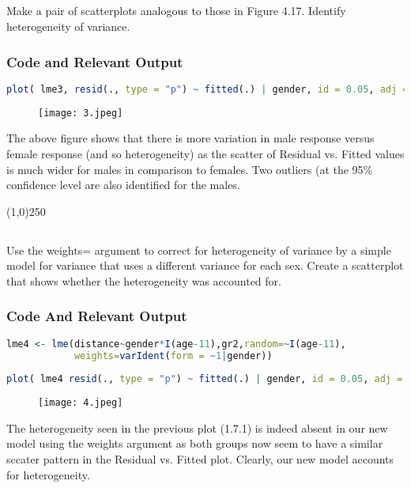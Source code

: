 \documentclass[a4paper]{article}
\begin{document}
\subsection{}Make a pair of scatterplots analogous to those in Figure 4.17. Identify heterogeneity of variance.
\subsubsection{Code and Relevant Output}
\begin{lstlisting}[language=R]
plot( lme3, resid(., type = "p") ~ fitted(.) | gender, id = 0.05, adj = -0.3 )
\end{lstlisting}
\begin{figure}[H]
\centering
\texttt{[image: 3.jpeg]}\\
\end{figure}
 The above figure shows that there is more variation in male response versus female response (and so heterogeneity) as the scatter of Residual vs. Fitted values is much wider for males in comparison to females. Two outliers (at the 95\% confidence level are also identified for the males.
\begin{center}
\line(1,0){250}
\end{center}


\subsection{}Use the weights= argument to correct for heterogeneity of variance by a simple model for variance that uses a different variance for each sex. Create a scatterplot that shows whether the heterogeneity was accounted for.
\subsubsection{Code And Relevant Output}
\begin{lstlisting}[language=R]
lme4 <- lme(distance~gender*I(age-11),gr2,random=~I(age-11), 
			weights=varIdent(form = ~1|gender))
            
plot( lme4 resid(., type = "p") ~ fitted(.) | gender, id = 0.05, adj = -0.3 )
\end{lstlisting}
\begin{figure}[H]
\centering
\texttt{[image: 4.jpeg]}\\
\end{figure}
 The heterogeneity seen in the previous plot (1.7.1) is indeed absent in our new model using the weights argument as both groups now seem to have a similar sccater pattern in the Residual vs. Fitted plot. Clearly, our new model accounts for heterogeneity.
\end{document}
